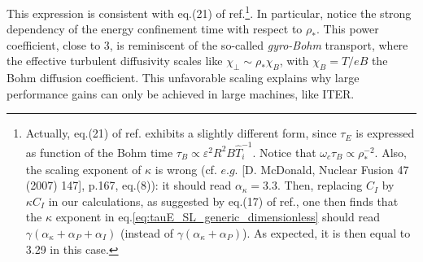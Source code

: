 This expression is consistent with eq.(21) of ref.\cite{ITERphysics_chap2}\footnote{Actually, eq.(21) of ref.\cite{ITERphysics_chap2} exhibits a slightly different form, since $\tau_E$ is expressed as function of the Bohm time $\tau_B \propto \varepsilon^2R^2B\hat T_i^{-1}$. Notice that $\omega_c\tau_B \propto \rho_*^{-2}$. Also, the scaling exponent of $\kappa$ is wrong (cf. $e.g.$ [D. McDonald, Nuclear Fusion 47 (2007) 147], p.167, eq.(8)): it should read $\alpha_\kappa = 3.3$. Then, replacing $C_I$ by $\kappa C_I$ in our calculations, as suggested by eq.(17) of ref.\cite{ITERphysics_chap2}, one then finds that the $\kappa$ exponent in eq.\ref{eq:tauE_SL_generic_dimensionless} should read $\gamma(\alpha_\kappa+\alpha_P+\alpha_I)$ (instead of $\gamma(\alpha_\kappa+\alpha_P)$). As expected, it is then equal to 3.29 in this case.}. In particular, notice the strong dependency of the energy confinement time with respect to $\rho_*$. This power coefficient, close to 3, is reminiscent of the so-called \emph{gyro-Bohm} transport, where the effective turbulent diffusivity scales like $\chi_\perp \sim \rho_* \chi_{B}$, with $\chi_B = T/eB$ the Bohm diffusion coefficient. This unfavorable scaling explains why large performance gains can only be achieved in large machines, like ITER.
